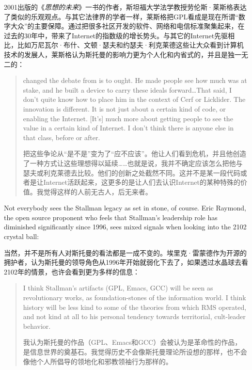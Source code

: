 \ifdefined\chs
2001出版的《\textit{思想的未来}》一书的作者，斯坦福大学法学教授劳伦斯·莱斯格表达了类似的乐观观点。与其它法律界的学者一样，莱斯格把GPL看成是现在所谓``数字大众''的主要保障。通过把很多社区开发的软件、网络和电信标准聚集起来，在过去的30年中，带来了Internet的指数级的增长势头。与其它的Internet先驱相比，比如万尼瓦尔·布什、文顿·瑟夫和约瑟夫·利克莱德这些让大众看到计算机技术的发展人，莱斯格认为斯托曼的影响力更为个人化和内省式的，并且是独一无二的：
\fi

\begin{quote}
\ifdefined\eng
[Stallman] changed the debate from is to ought. He made people see how much was at stake, and he built a device to carry these ideals forward\ldots That said, I don't quite know how to place him in the context of Cerf or Licklider. The innovation is different. It is not just about a certain kind of code, or enabling the Internet. [It's] much more about getting people to see the value in a certain kind of Internet. I don't think there is anyone else in that class, before or after.
\fi

\ifdefined\chs
[斯托曼]把这些争论从``是不是''变为了``应不应该''。他让人们看到危机，并且他创造了一种方式让这些理想得以延续……也就是说，我并不确定应该怎么把他与瑟夫或利克莱德去比较。他们的创新之处截然不同。这并不是某一段代码或者是让Internet活跃起来，这更多的是让人们去认识Internet的某种特殊的价值。我觉得这样的人前无古人，后无来者。
\fi
\end{quote}

\ifdefined\eng
Not everybody sees the Stallman legacy as set in stone, of course. Eric Raymond, the open source proponent who feels that Stallman's leadership role has diminished significantly since 1996, sees mixed signals when looking into the 2102 crystal ball:
\fi

\ifdefined\chs
当然，并不是所有人对斯托曼的看法都是一成不变的。埃里克·雷蒙德作为开源的拥护者，认为斯托曼的领导角色从1996年开始就弱化下去了，如果透过水晶球去看2102年的情景，也许会看到更为多样的信息：
\fi

\begin{quote}
\ifdefined\eng
I think Stallman's artifacts (GPL, Emacs, GCC) will be seen as revolutionary works, as foundation-stones of the information world. I think history will be less kind to some of the theories from which RMS operated, and not kind at all to his personal tendency towards territorial, cult-leader behavior.
\fi

\ifdefined\chs
我认为斯托曼的作品（GPL、Emacs和GCC）会被认为是革命性的作品，是信息世界的奠基石。我觉得历史不会像斯托曼理论所设想的那样，也不会像他个人所倡导的领地化和邪教领袖行为那样的。
\fi
\end{quote}

